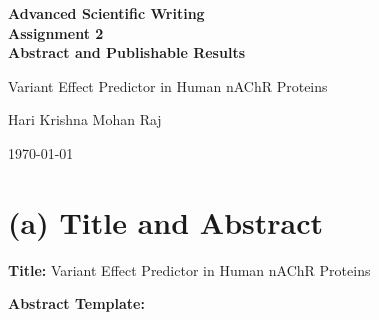 \documentclass[12pt,a4paper]{article}
\begin{document}
\begin{titlepage}
\centering
\vspace*{3cm}
{\LARGE\bfseries Advanced Scientific Writing\\[0.3cm]
Assignment 2\\[0.3cm]
Abstract and Publishable Results\par}
\vspace{2cm}
{\Large Variant Effect Predictor in Human nAChR Proteins\par}
\vspace{2.5cm}
{\large Hari Krishna Mohan Raj\par}
\vspace{1cm}
{\large \today\par}
\vfill
\end{titlepage}

\section*{(a) Title and Abstract}

\textbf{Title:} Variant Effect Predictor in Human nAChR Proteins

\vspace{0.5em}
\textbf{Abstract Template:}
\end{document}
